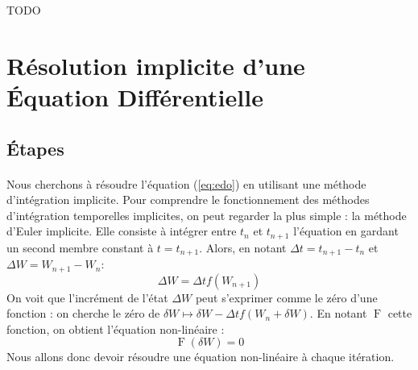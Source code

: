 

\maketitle
{}
\tableofcontents





\pagebreak

TODO

\section{Résolution implicite d'une Équation Différentielle}

	\subsection{Étapes}

		\paragraph{}
		Nous cherchons à résoudre l'équation (\ref{eq:edo}) en utilisant une méthode d'intégration implicite.
		Pour comprendre le fonctionnement des méthodes d'intégration temporelles implicites, on peut regarder la plus simple : la méthode d'Euler implicite.
		Elle consiste à intégrer entre $t_n$ et $t_{n+1}$ l'équation en gardant un second membre constant à $t = t_{n+1}$.
		Alors, en notant $\Delta t = t_{n+1} - t_n$ et $\Delta W = W_{n+1} - W_n$:
		\[\Delta W = \Delta t f\left(W_{n+1}\right)\]
		On voit que l'incrément de l'état $\Delta W$ peut s'exprimer comme le zéro d'une fonction : on cherche le zéro de $\delta W \mapsto \delta W - \Delta t f\left(W_n + \delta W\right)$.
		En notant $\operatorname{F}$ cette fonction, on obtient l'équation non-linéaire :
		\begin{equation}\label{eq:non_linear}
			\operatorname{F}\left(\delta W\right) = 0
		\end{equation}
		Nous allons donc devoir résoudre une équation non-linéaire à chaque itération.


